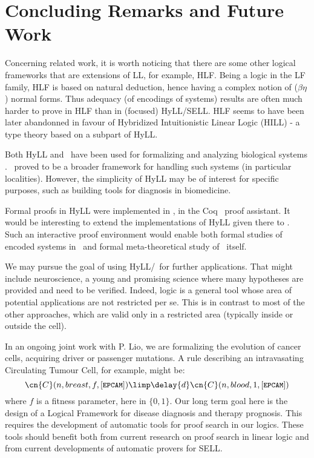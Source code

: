\documentclass{llncs}
\begin{document}
\section{Concluding Remarks and Future Work} 
\label{sec:conclusion}
% 
Concerning related work, it is worth noticing that there are some other 
logical frameworks that are extensions of LL, for example,  
HLF\cite{reed06hylo}.
Being a logic in the LF family, HLF is based on natural deduction, hence
having a complex notion of ($\beta \eta$) normal forms.
Thus adequacy (of encodings of systems) results are often much harder to 
prove in HLF than in (focused) HyLL/SELL.
%
HLF seems to have been later abandonned in favour of Hybridized Intuitionistic 
Linear Logic (HILL) \cite{Caires-Perez-Pfenning:hill14-sub}
- a type theory based on a subpart of HyLL. 
  
% 
Both HyLL and \sell\ have been used for formalizing and analyzing biological systems 
\cite{deMaria-Despeyroux-Felty:14-fmmb,DBLP:journals/entcs/ChiarugiFHO15}. 
\sell\ proved to be a broader framework for handling such systems 
(in particular localities).
However, the simplicity of HyLL may be of interest  for specific purposes, 
such as building tools for diagnosis in biomedicine.
%

Formal proofs in HyLL were implemented in 
\cite{deMaria-Despeyroux-Felty:14-fmmb}, in the 
Coq~\cite{BertotCasteran:2004} proof assistant.
It would be interesting to extend the implementations of HyLL given there to 
\sell.
Such an interactive proof environment
would enable both formal studies of encoded systems in \sell\ and formal 
meta-theoretical study of \sell\ itself.

We may pursue the goal of using HyLL/\sell\ for further applications. 
That might include neuroscience, a young and promising
science where many hypotheses are provided and need to be verified. 
Indeed, logic is a general tool whose area of potential applications are not 
restricted per se. 
This is in contrast to most of the other approaches, which are valid only 
in a restricted area (typically inside or outside the cell).

In an ongoing joint work with P. Lio, we are formalizing the evolution of 
cancer cells, acquiring driver or passenger mutations. 
A rule describing an intravasating Circulating Tumour Cell, for example,
might be:
$$\cn{C}(n,breast,f,[{\small \texttt{EPCAM}}]) 
   \limp \delay{d} \cn{C}(n,blood,1,[{\small \texttt{EPCAM}}])
$$
where $f$ is a fitness parameter, here in $\{0,1\}$.
Our long term goal here is the design of 
a Logical Framework for disease diagnosis and therapy prognosis.
This requires the development of automatic tools for proof search in our logics.
These tools should benefit both 
from current research on proof search in linear logic 
and from current developments of automatic provers for SELL.



 \vfill
\end{document}
